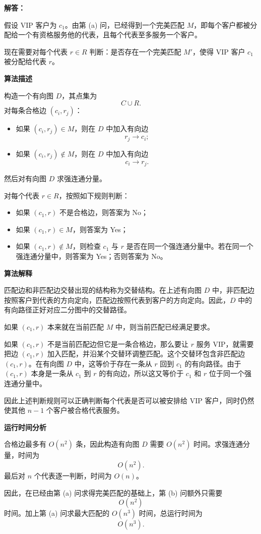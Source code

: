 \documentclass[12pt,a4paper]{article}
\begin{document}
\begin{answerbox}
\textbf{解答：}

假设 VIP 客户为 $c_1$。由第 (a) 问，已经得到一个完美匹配 $M$，即每个客户都被分配给一个有资格服务他的代表，且每个代表至多服务一个客户。

现在需要对每个代表 $r\in R$ 判断：是否存在一个完美匹配 $M'$，使得 VIP 客户 $c_1$ 被分配给代表 $r$。


\textbf{算法描述}

构造一个有向图 $D$，其点集为
\[
  C\cup R.
\]
对每条合格边 $(c_i,r_j)$：
\begin{itemize}[leftmargin=2em]
  \item 如果 $(c_i,r_j)\in M$，则在 $D$ 中加入有向边
  \[
    r_j\to c_i;
  \]
  \item 如果 $(c_i,r_j)\notin M$，则在 $D$ 中加入有向边
  \[
    c_i\to r_j.
  \]
\end{itemize}
然后对有向图 $D$ 求强连通分量。

对每个代表 $r\in R$，按照如下规则判断：
\begin{itemize}[leftmargin=2em]
  \item 如果 $(c_1,r)$ 不是合格边，则答案为 No；
  \item 如果 $(c_1,r)\in M$，则答案为 Yes；
  \item 如果 $(c_1,r)\notin M$，则检查 $c_1$ 与 $r$ 是否在同一个强连通分量中。若在同一个强连通分量中，则答案为 Yes；否则答案为 No。
\end{itemize}


\textbf{算法解释}

匹配边和非匹配边交替出现的结构称为交替结构。在上述有向图 $D$ 中，非匹配边按照客户到代表的方向定向，匹配边按照代表到客户的方向定向。因此，$D$ 中的有向路径正好对应二分图中的交替路径。

如果 $(c_1,r)$ 本来就在当前匹配 $M$ 中，则当前匹配已经满足要求。

如果 $(c_1,r)$ 不是当前匹配边但它是一条合格边，那么要让 $r$ 服务 VIP，就需要把边 $(c_1,r)$ 加入匹配，并沿某个交替环调整匹配。这个交替环包含非匹配边 $(c_1,r)$。在有向图 $D$ 中，这等价于存在一条从 $r$ 回到 $c_1$ 的有向路径。由于 $(c_1,r)$ 本身是一条从 $c_1$ 到 $r$ 的有向边，所以这又等价于 $c_1$ 和 $r$ 位于同一个强连通分量中。

因此上述判断规则可以正确判断每个代表是否可以被安排给 VIP 客户，同时仍然使其他 $n-1$ 个客户被合格代表服务。

\textbf{运行时间分析}

合格边最多有 $O(n^2)$ 条，因此构造有向图 $D$ 需要 $O(n^2)$ 时间。求强连通分量，时间为
\[
  O(n^2).
\]
最后对 $n$ 个代表逐一判断，时间为 $O(n)$。

因此，在已经由第 (a) 问求得完美匹配的基础上，第 (b) 问额外只需要
\[
  O(n^2)
\]
时间。加上第 (a) 问求最大匹配的 $O(n^3)$ 时间，总运行时间为
\[
  O(n^3).
\]

\end{answerbox}
\end{document}
